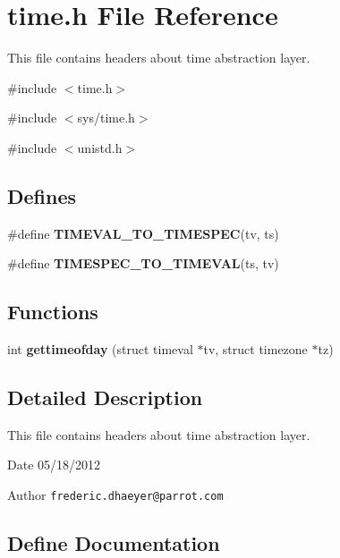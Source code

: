 \section{time.h File Reference}
\label{time_8h}


This file contains headers about time abstraction layer.  


{\ttfamily \#include $<$time.h$>$}\par
{\ttfamily \#include $<$sys/time.h$>$}\par
{\ttfamily \#include $<$unistd.h$>$}\par
\subsection*{Defines}
\begin{DoxyCompactItemize}
\item 
\#define {\bfseries TIMEVAL\_\-TO\_\-TIMESPEC}(tv, ts)
\item 
\#define {\bfseries TIMESPEC\_\-TO\_\-TIMEVAL}(ts, tv)
\end{DoxyCompactItemize}
\subsection*{Functions}
\begin{DoxyCompactItemize}
\item 
int {\bfseries gettimeofday} (struct timeval $\ast$tv, struct timezone $\ast$tz)\label{time_8h_aaf2d0a99430a6d5253b8c395c30ca7e3}

\end{DoxyCompactItemize}


\subsection{Detailed Description}
This file contains headers about time abstraction layer. \begin{DoxyDate}{Date}
05/18/2012 
\end{DoxyDate}
\begin{DoxyAuthor}{Author}
{\tt frederic.dhaeyer@parrot.com} 
\end{DoxyAuthor}


\subsection{Define Documentation}

